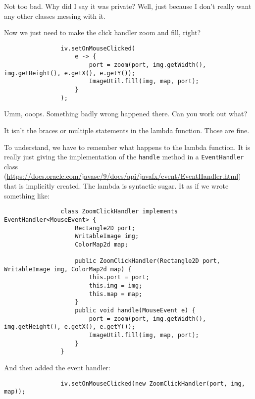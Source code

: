 \documentclass{article}
\begin{document}
            Not too bad. Why did I say it was private? Well, just because I don't really want any other classes messing with it.
            
            Now we just need to make the click handler zoom and fill, right?
            
            \begin{verbatim}
                iv.setOnMouseClicked(
                    e -> {
                        port = zoom(port, img.getWidth(), img.getHeight(), e.getX(), e.getY());
                        ImageUtil.fill(img, map, port);
                    }
                );
            \end{verbatim}

            \newpage
            Umm, ooops. Something badly wrong happened there. Can you work out what?
            
            It isn't the braces or multiple statements in the lambda function. Those are fine.
            
            To understand, we have to remember what happens to the lambda function. It is really just giving the implementation of the
            \texttt{handle} method in a \texttt{EventHandler} class
            (\url{https://docs.oracle.com/javase/9/docs/api/javafx/event/EventHandler.html}) that is implicitly created. The lambda is
            syntactic sugar. It as if we wrote something like:
            
            \begin{verbatim}
                class ZoomClickHandler implements EventHandler<MouseEvent> {
                    Rectangle2D port;
                    WritableImage img;
                    ColorMap2d map;
                    
                    public ZoomClickHandler(Rectangle2D port, WritableImage img, ColorMap2d map) {
                        this.port = port;
                        this.img = img;
                        this.map = map;
                    }
                    public void	handle​(MouseEvent e) {
                        port = zoom(port, img.getWidth(), img.getHeight(), e.getX(), e.getY());
                        ImageUtil.fill(img, map, port);
                    }
                }
            \end{verbatim}
            
            And then added the event handler:

            \begin{verbatim}
                iv.setOnMouseClicked(new ZoomClickHandler(port, img, map));
            \end{verbatim}
            
\end{document}
